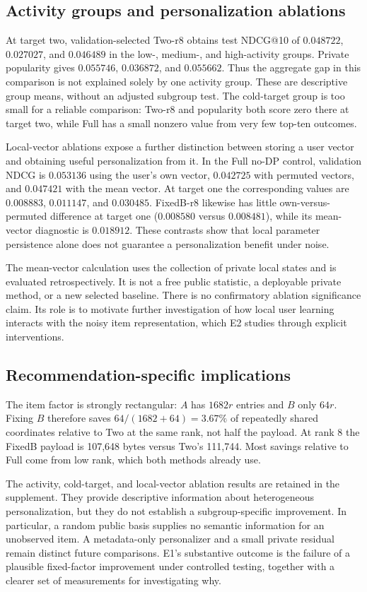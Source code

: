 \subsection{Activity groups and personalization ablations}
At target two, validation-selected Two-r8 obtains test NDCG@10 of
$0.048722$, $0.027027$, and $0.046489$ in the low-, medium-, and
high-activity groups. Private popularity gives $0.055746$, $0.036872$,
and $0.055662$. Thus the aggregate gap in this comparison is not explained
solely by one activity group. These are descriptive group means, without
an adjusted subgroup test. The cold-target group is too small for a reliable
comparison: Two-r8 and popularity both score zero there at target two,
while Full has a small nonzero value from very few top-ten outcomes.

Local-vector ablations expose a further distinction between storing a user
vector and obtaining useful personalization from it. In the Full no-DP
control, validation NDCG is $0.053136$ using the user's own vector,
$0.042725$ with permuted vectors, and $0.047421$ with the mean vector.
At target one the corresponding values are $0.008883$, $0.011147$,
and $0.030485$. FixedB-r8 likewise has little own-versus-permuted difference
at target one ($0.008580$ versus $0.008481$), while its mean-vector
diagnostic is $0.018912$. These contrasts show that local parameter
persistence alone does not guarantee a personalization benefit under noise.

The mean-vector calculation uses the collection of private local states
and is evaluated retrospectively. It is not a free public statistic,
a deployable private method, or a new selected baseline. There is no
confirmatory ablation significance claim. Its role is to motivate further
investigation of how local user learning interacts with the noisy item
representation, which E2 studies through explicit interventions.

\subsection{Recommendation-specific implications}
The item factor is strongly rectangular: $A$ has $1682r$ entries and $B$
only $64r$. Fixing $B$ therefore saves $64/(1682+64)=3.67\%$ of repeatedly
shared coordinates relative to Two at the same rank, not half the payload.
At rank 8 the FixedB payload is 107,648 bytes versus Two's 111,744. Most
savings relative to Full come from low rank, which both methods already use.

The activity, cold-target, and local-vector ablation results are retained in
the supplement. They provide descriptive information about heterogeneous
personalization, but they do not establish a subgroup-specific improvement.
In particular, a random public basis supplies no semantic information for
an unobserved item. A metadata-only personalizer and a small private residual
remain distinct future comparisons. E1's substantive outcome is the failure
of a plausible fixed-factor improvement under controlled testing, together
with a clearer set of measurements for investigating why.
\FloatBarrier
